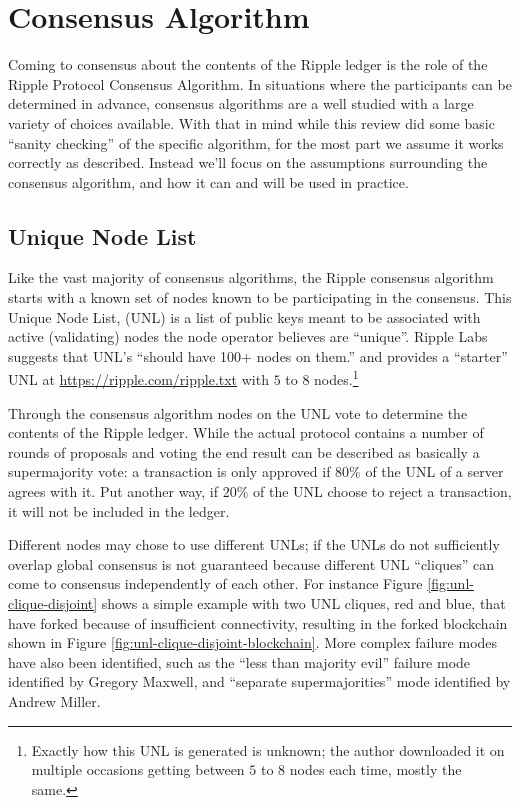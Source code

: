 \documentclass{article}
\begin{document}
\section{Consensus Algorithm}

Coming to consensus about the contents of the Ripple ledger is the role of the
Ripple Protocol Consensus Algorithm\cite{ripple-consensus-paper}. In situations
where the participants can be determined in advance, consensus algorithms are a
well studied with a large variety of choices available. With that in mind while
this review did some basic ``sanity checking'' of the specific algorithm, for
the most part we assume it works correctly as described. Instead we'll focus on
the assumptions surrounding the consensus algorithm, and how it can and will be
used in practice.


\subsection{Unique Node List}

Like the vast majority of consensus algorithms, the Ripple consensus algorithm
starts with a known set of nodes known to be participating in the consensus.
This Unique Node List, (UNL) is a list of public keys meant to be associated
with active (validating) nodes the node operator believes are
``unique''.\cite{ripple-wiki-unl} Ripple Labs suggests that UNL's ``should have
100+ nodes on them.''\cite{ripple-wiki-unl} and provides a ``starter'' UNL at
\url{https://ripple.com/ripple.txt} with $5$ to $8$ nodes.\footnote{Exactly how
this UNL is generated is unknown; the author downloaded it on multiple
occasions getting between $5$ to $8$ nodes each time, mostly the same.}

Through the consensus algorithm nodes on the UNL vote to determine the contents
of the Ripple ledger. While the actual protocol contains a number of rounds of
proposals and voting the end result can be described as basically a
supermajority vote: a transaction is only approved if $80\%$ of the UNL of a
server agrees with it.\cite[3.2]{ripple-consensus-paper} Put another way, if
$20\%$ of the UNL choose to reject a transaction, it will not be included in
the ledger.

Different nodes may chose to use different UNLs; if the UNLs do not
sufficiently overlap global consensus is not guaranteed because different UNL
``cliques'' can come to consensus independently of each other. For instance
Figure \ref{fig:unl-clique-disjoint} shows a simple example with two UNL
cliques, red and blue, that have forked because of insufficient connectivity,
resulting in the forked blockchain shown in Figure
\ref{fig:unl-clique-disjoint-blockchain}. More complex failure modes have also
been identified, such as the ``less than majority evil'' failure mode
identified by Gregory Maxwell,\cite{gmaxwell-btctalk-ripple} and ``separate
supermajorities'' mode identified by Andrew Miller.\cite{amiller-rippletalk}
\end{document}
